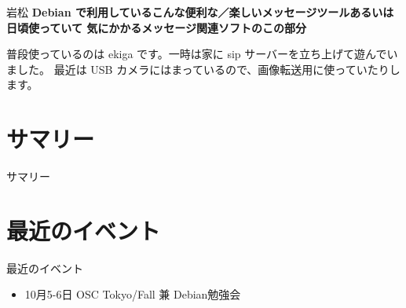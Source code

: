 \documentclass[cjk,dvipdfmx,12pt]{beamer}
\begin{document}
\begin{frame}{岩松}
\textbf{Debian で利用しているこんな便利な／楽しいメッセージツールあるいは日頃使っていて
気にかかるメッセージ関連ソフトのこの部分}

普段使っているのは ekiga です。一時は家に sip サーバーを立ち上げて遊んでいました。
最近は USB カメラにはまっているので、画像転送用に使っていたりします。
\end{frame}


\section{サマリー}

\begin{frame}{サマリー}

\end{frame}

\section{最近のイベント}
\begin{frame}{最近のイベント}
\begin{itemize}
 \item 10月5-6日 OSC Tokyo/Fall 兼 Debian勉強会
\end{itemize}
\end{frame}
\end{document}
